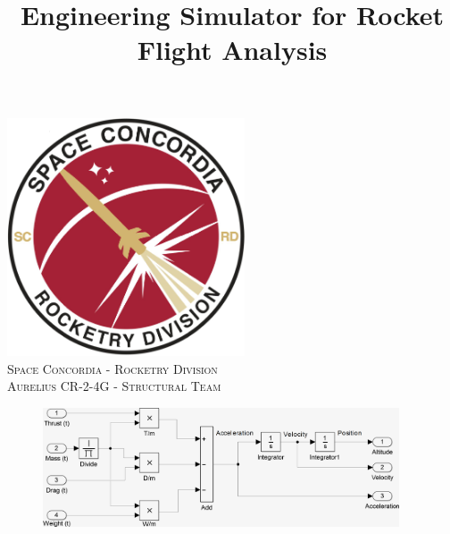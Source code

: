 \documentclass[]{article}
\title{Engineering Simulator for Rocket Flight Analysis}
\date{}
\begin{document}

%
%
\begin{titlepage}

\newcommand{\HRule}{\rule{\linewidth}{0.5mm}} %

\center %
 

\includegraphics[width=200pt,height=200pt]{../images/rocketry_logo_large.png}\\[1cm] %
\textsc{\Large Space Concordia - Rocketry Division}\\[0.5cm] %
\textsc{\large Aurelius CR-2-4G - Structural Team}\\[0.5cm] %


\begin{figure}[ht]
    \centering
    \includegraphics[height=100pt]{../images/vertical_model_simplified.png}\\
\end{figure}


\end{titlepage}
\end{document}
